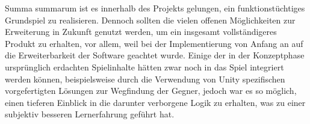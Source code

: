 Summa summarum ist es innerhalb des Projekts gelungen, ein funktionstüchtiges Grundspiel zu realisieren. Dennoch sollten die vielen offenen Möglichkeiten zur Erweiterung in Zukunft genutzt werden, um ein insgesamt vollständigeres Produkt zu erhalten, vor allem, weil bei der Implementierung von Anfang an auf die Erweiterbarkeit der Software geachtet wurde. Einige der in der Konzeptphase ursprünglich erdachten Spielinhalte hätten zwar noch in das Spiel integriert werden können, beispielsweise durch die Verwendung von Unity spezifischen vorgefertigten Lösungen zur Wegfindung der Gegner, jedoch war es so möglich, einen tieferen Einblick in die darunter verborgene Logik zu erhalten, was zu einer subjektiv besseren Lernerfahrung geführt hat.

